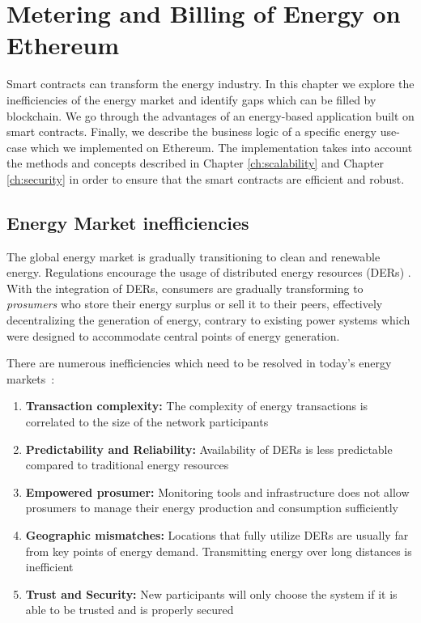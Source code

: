 \chapter{Metering and Billing of Energy on Ethereum}\label{ch:implementation}

Smart contracts can transform the energy industry. In this chapter we explore the inefficiencies of the energy market and identify gaps which can be filled by blockchain. We go through the advantages of an energy-based application built on smart contracts. Finally, we describe the business logic of a specific energy use-case which we implemented on Ethereum. The implementation takes into account the methods and concepts described in Chapter \ref{ch:scalability} and Chapter \ref{ch:security} in order to ensure that the smart contracts are efficient and robust.


\section{Energy Market inefficiencies}

The global energy market is gradually transitioning to clean and renewable energy. Regulations encourage the usage of distributed energy resources (DERs) \cite{europe2030}. With the integration of DERs, consumers are gradually transforming to \textit{prosumers} who store their energy surplus or sell it to their peers, effectively decentralizing the generation of energy, contrary to existing power systems which were designed to accommodate central points of energy generation.

There are numerous inefficiencies which need to be resolved in today's energy markets~\cite{ey-inefficiencies}:
\begin{enumerate}
    \item \textbf{Transaction complexity:} The complexity of energy transactions is correlated to the size of the network participants
    \item \textbf{Predictability and Reliability:} Availability of DERs is less predictable compared to traditional energy resources
    \item \textbf{Empowered prosumer:} Monitoring tools and infrastructure does not allow prosumers to manage their energy production and consumption sufficiently
    \item \textbf{Geographic mismatches:} Locations that fully utilize DERs are usually far from key points of energy demand. Transmitting energy over long distances is inefficient
    \item \textbf{Trust and Security:} New participants will only choose the system if it is able to be trusted and is properly secured
\end{enumerate}

